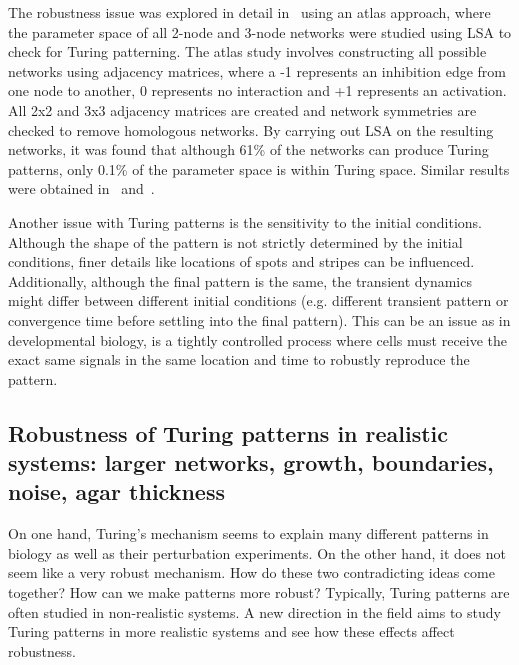 The robustness issue was explored in detail in~\cite{Scholes2019} using an atlas approach, where the parameter space of all 2-node and 3-node networks were studied using LSA to check for Turing patterning.
The atlas study involves constructing all possible networks using adjacency matrices, where a -1 represents an inhibition edge from one node to another, 0 represents no interaction and +1 represents an activation.
All 2x2 and 3x3 adjacency matrices are created and network symmetries are checked to remove homologous networks.
By carrying out LSA on the resulting networks, it was found that although 61\% of the networks can produce Turing patterns, only 0.1\% of the parameter space is within Turing space.
Similar results were obtained in~\cite{Zheng2016} and~\cite{Marcon}.


Another issue with Turing patterns is the sensitivity to the initial conditions.
Although the shape of the pattern is not strictly determined by the initial conditions, finer details like locations of spots and stripes can be influenced.
Additionally, although the final pattern is the same, the transient dynamics might differ between different initial conditions (e.g. different transient pattern or convergence time before settling into the final pattern).
This can be an issue as in developmental biology, is a tightly controlled process where cells must receive the exact same signals in the same location and time to robustly reproduce the pattern. %





\subsection{Robustness of Turing patterns in realistic systems: larger networks, growth, boundaries, noise, agar thickness}
On one hand, Turing's mechanism seems to explain many different patterns in biology as well as their perturbation experiments.
On the other hand, it does not seem like a very robust mechanism.
How do these two contradicting ideas come together?
How can we make patterns more robust?
Typically, Turing patterns are often studied in non-realistic systems.
A new direction in the field aims to study Turing patterns in more realistic systems and see how these effects affect robustness.


